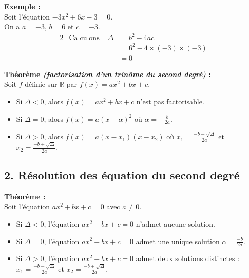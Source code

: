 \documentclass[11pt,a4paper]{article}
\begin{document}
\textbf{Exemple :} ~\\
Soit l'équation $-3x^2+6x-3=0$. \\
On a $a=-3$, $b=6$ et $c=-3$.
\vspace{-6pt}
\begin{alignat*}{2}
	 & \text{Calculons } & \Delta & = b^2-4ac                     \\
	 &                   &        & = 6^2 - 4\times(-3)\times(-3) \\
	 &                   &        & = 0
\end{alignat*}

\begin{mdframed}[style=proprieteStyle]
	\textbf{Théorème \emph{(factorisation d'un trinôme du second degré)} :} ~\\
	Soit $f$ définie sur $\mathbb{R}$ par $f(x)=ax^2+bx+c$.
	\vspace{-6pt}
	\begin{itemize}
		\item Si $\Delta<0$, alors $f(x)=ax^2+bx+c$ n'est pas factorisable.
		\item Si $\Delta=0$, alors $f(x)=a(x-\alpha)^2$ où $\alpha=-\frac{b}{2a}$.
		\item Si $\Delta>0$, alors $f(x)=a(x-x_1)(x-x_2)$ où $x_1=\frac{-b-\sqrt{\Delta}}{2a}$ et $x_2=\frac{-b+\sqrt{\Delta}}{2a}$.
	\end{itemize}
\end{mdframed}

\subsection*{2. Résolution des équation du second degré}

\begin{mdframed}[style=proprieteStyle]
	\textbf{Théorème :} ~\\
	Soit l'équation $ax^2+bx+c=0$ avec $a\not=0$.
	\vspace{-6pt}
	\begin{itemize}
		\item Si $\Delta<0$, l'équation $ax^2+bx+c=0$ n'admet aucune solution.
		\item Si $\Delta=0$, l'équation $ax^2+bx+c=0$ admet une unique solution $\alpha=\frac{-b}{2a}$.
		\item Si $\Delta>0$, l'équation $ax^2+bx+c=0$ admet deux solutions distinctes : $x_1=\frac{-b-\sqrt{\Delta}}{2a}$ et $x_2=\frac{-b+\sqrt{\Delta}}{2a}$.
	\end{itemize}
\end{mdframed}
\end{document}
